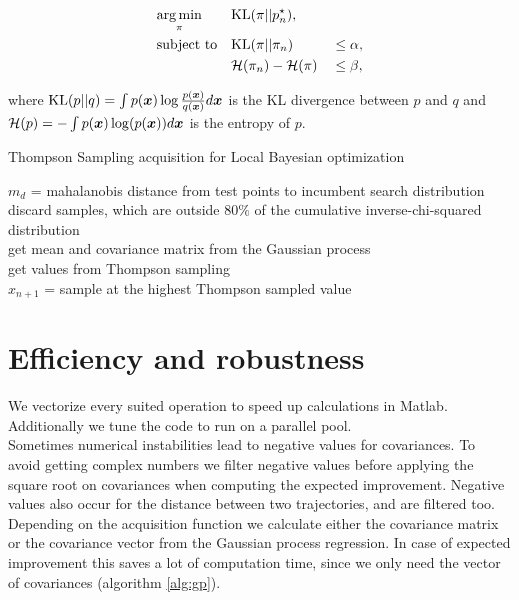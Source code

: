 \begin{align}
    & \underset{\pi}{\arg\min} & & \mathrm{KL}(\pi||p_n^\star),& &\notag\\
    & \text{subject to}
    & & \mathrm{KL}(\pi||\pi_n) & &\leq \alpha,\label{eq:kl:our}\\
    & & &{\cal H}(\pi_n) - {\cal H}(\pi) & &\leq \beta,\label{eq:entropy:our}
\end{align}

where $\mathrm{KL}(p||q) = \int p({\boldsymbol{x}}) \log \frac{p({\boldsymbol{x}})}{q({\boldsymbol{x}})} d{\boldsymbol{x}}$ is the KL divergence between $p$ and $q$ and ${\cal H}(p) = -\int p({\boldsymbol{x}})\log(p({\boldsymbol{x}})) d{\boldsymbol{x}}$ is the entropy of $p$.

\begin{algorithm}
    \caption{Thompson Sampling acquisition for Local Bayesian optimization\label{alg:acqLocalBO}}
    \BlankLine

    $m_d$ = mahalanobis distance from test points to incumbent search distribution\\
    discard samples, which are outside $80\%$ of the cumulative inverse-chi-squared distribution\\
    get mean and covariance matrix from the Gaussian process\\
    get values from Thompson sampling\\
    $x_{n+1}$ = sample at the highest Thompson sampled value\\
\end{algorithm}


\section{Efficiency and robustness}
We vectorize every suited operation to speed up calculations in Matlab. Additionally we tune the code to run on a parallel pool.\\

Sometimes numerical instabilities lead to negative values for covariances. To avoid getting complex numbers we filter negative values before applying the square root on covariances when computing the expected improvement. Negative values also occur for the distance between two trajectories, and are filtered too.\\

Depending on the acquisition function we calculate either the covariance matrix or the covariance vector from the Gaussian process regression. In case of expected improvement this saves a lot of computation time, since we only need the vector of covariances (algorithm \ref{alg:gp}). \\

